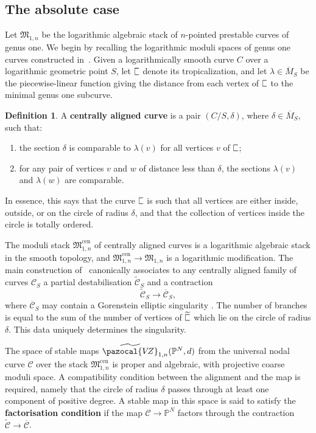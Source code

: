 \documentclass[11pt]{amsart}
\newcommand{\plC}{\scalebox{0.8}[1.3]{$\sqsubset$}}
\newcommand{\sqC}{\scalebox{0.8}[1.3]{$\sqsubset$}}
\newcommand{\PP}{\mathbb P}
\newcommand{\VZ}{\pazocal{V\!Z}}
\renewcommand{\to}{\rightarrow}
\theoremstyle{definition}
\theoremstyle{definition}
\newtheorem{definition}[thm]{Definition}
\begin{document}
\subsection{The absolute case} Let $\mathfrak M_{1,n}$ be the logarithmic algebraic stack of $n$-pointed prestable curves of genus one. We begin by recalling the logarithmic moduli spaces of genus one curves constructed in~\cite[\S 2 \& \S 4]{RSPW}. Given a logarithmically smooth curve $C$ over a logarithmic geometric point $S$, let $\plC$ denote its tropicalization, and let $\lambda \in \overline{M}_{S}$ be the piecewise-linear function giving the distance from each vertex of $\sqC$ to the minimal genus one subcurve.
\begin{definition}
A \textbf{centrally aligned curve} is a pair $(C/S,\delta)$, where $\delta\in\overline{M}_S$, such that:
\begin{enumerate}
    \item the section $\delta$ is comparable to $\lambda(v)$ for all vertices $v$ of $\plC$;
    \item for any pair of vertices $v$ and $w$ of distance less than $\delta$, the sections $\lambda(v)$ and $\lambda(w)$ are comparable.
\end{enumerate}
\end{definition}
In essence, this says that the curve $\sqC$ is such that all vertices are either inside, outside, or on the circle of radius $\delta$, and that the collection of vertices inside the circle is totally ordered.

The moduli stack $\mathfrak M_{1,n}^{\mathrm{cen}}$  of centrally aligned curves is a logarithmic algebraic stack in the smooth topology, and $\mathfrak M_{1,n}^{\mathrm{cen}}\to\mathfrak M_{1,n}$ is a logarithmic modification. The main construction of~\cite{RSPW} canonically associates to any centrally aligned family of curves $\mathcal C_S$ a partial destabilisation $\widetilde{\mathcal C}_S$ and a contraction
\[
\widetilde{\mathcal C}_S\to \overline{\mathcal C}_S,
\]
where $\overline{\mathcal C}_S$ may contain a Gorenstein elliptic singularity \cite{SMY1}. The number of branches is equal to the sum of the number of vertices of $\widetilde{\sqC}$ which lie on the circle of radius $\delta$. This data uniquely determines the singularity.

The space of stable maps $\widetilde\VZ_{1,n}(\PP^N,d)$ from the universal nodal curve $\mathcal C$ over the stack $\mathfrak M_{1,n}^{\mathrm{cen}}$ is proper and algebraic, with projective coarse moduli space. A compatibility condition between the alignment and the map is required, namely that the circle of radius $\delta$ passes through at least one component of positive degree. A stable map in this space is said to satisfy the \textbf{factorisation condition} if the map $\mathcal C\to \mathbb P^N$ factors through the contraction $\widetilde{\mathcal C}\to \overline{\mathcal C}$.
 
\end{document}
